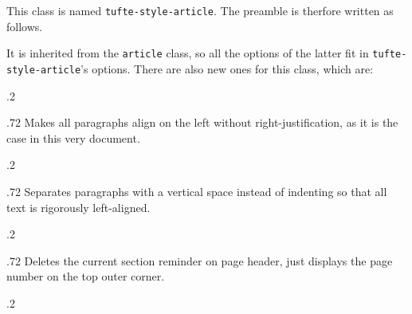 \documentclass[raggedright, twoside, 11pt, colorful]{tufte-style-article}
\begin{document}
This class is named \texttt{tufte-style-article}. The preamble is therfore written as follows.

It is inherited from the \texttt{article} class, so all the options of the latter fit in \texttt{tufte-style-article}'s options. There are also new ones for this class, which are:

\medskip
\begin{minipagewithmarginpars}[t]{.2\textwidth}
	\raggedleft
\end{minipagewithmarginpars}\hfill%
\begin{minipagewithmarginpars}[t]{.72\textwidth}
	Makes all paragraphs align on the left without right-justification, as it is the case in this very document. \\
\end{minipagewithmarginpars}
\smallskip
\begin{minipagewithmarginpars}[t]{.2\textwidth}
	\raggedleft
\end{minipagewithmarginpars}\hfill%
\begin{minipagewithmarginpars}[t]{.72\textwidth}
	Separates paragraphs with a vertical space instead of indenting so that all text is rigorously left-aligned.
\end{minipagewithmarginpars}
\smallskip
\begin{minipagewithmarginpars}[t]{.2\textwidth}
	\raggedleft
\end{minipagewithmarginpars}\hfill%
\begin{minipagewithmarginpars}[t]{.72\textwidth}
	Deletes the current section reminder on page header, just displays the page number on the top outer corner.
\end{minipagewithmarginpars}
\smallskip
\begin{minipagewithmarginpars}[t]{.2\textwidth}
	\raggedleft
\end{minipagewithmarginpars}\hfill%
\end{document}
